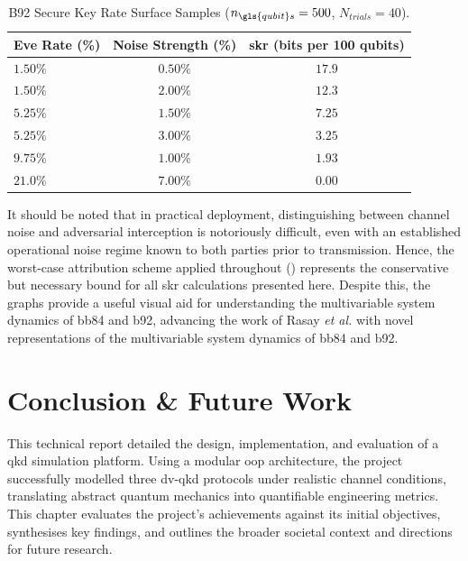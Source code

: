 \documentclass[11pt, a4paper]{report}
\renewcommand{\footnotesize}{\fontsize{9}{10}\selectfont}
\begin{document}
\begin{table}[htbp]
    \centering
    \caption{B92 Secure Key Rate Surface Samples ($n_{\gls{qubit}s}=500$, $N_{trials}=40$).}
    \label{tab:b92SKRsurface}
    \footnotesize
    \begin{tabular}{@{}l c c@{}}
        \toprule
        \textbf{Eve Rate (\%)} & \textbf{Noise Strength (\%)} & \textbf{\gls{skr} (bits per 100 \glspl{qubit})}\\
        \midrule
        $1.50\%$ & $0.50\%$ & \textbf{$17.9$} \\
        $1.50\%$ & $2.00\%$ & \textbf{$12.3$} \\
        $5.25\%$ & $1.50\%$ & \textbf{$7.25$} \\
        $5.25\%$ & $3.00\%$ & \textbf{$3.25$} \\
        $9.75\%$ & $1.00\%$ & \textbf{$1.93$} \\
        $21.0\%$ & $7.00\%$ & \textbf{$0.00$} \\
        \bottomrule
    \end{tabular}
\end{table}

It should be noted that in practical deployment, distinguishing between channel noise and adversarial interception is notoriously difficult, even with an established operational noise regime known to both parties prior to transmission. Hence, the worst-case attribution scheme applied throughout () represents the conservative but necessary bound for all \gls{skr} calculations presented here. Despite this, the graphs provide a useful visual aid for understanding the multivariable system dynamics of \gls{bb84} and \gls{b92}, advancing the work of Rasay \textit{et al.} \cite{rasay2026} with novel representations of the multivariable system dynamics of \gls{bb84} and \gls{b92}.


\chapter{Conclusion \& Future Work}

This technical report detailed the design, implementation, and evaluation of a \gls{qkd} simulation platform. Using a modular \gls{oop} architecture, the project successfully modelled three \gls{dv}-\gls{qkd} protocols under realistic channel conditions, translating abstract quantum mechanics into quantifiable engineering metrics. This chapter evaluates the project's achievements against its initial objectives, synthesises key findings, and outlines the broader societal context and directions for future research.
\end{document}
